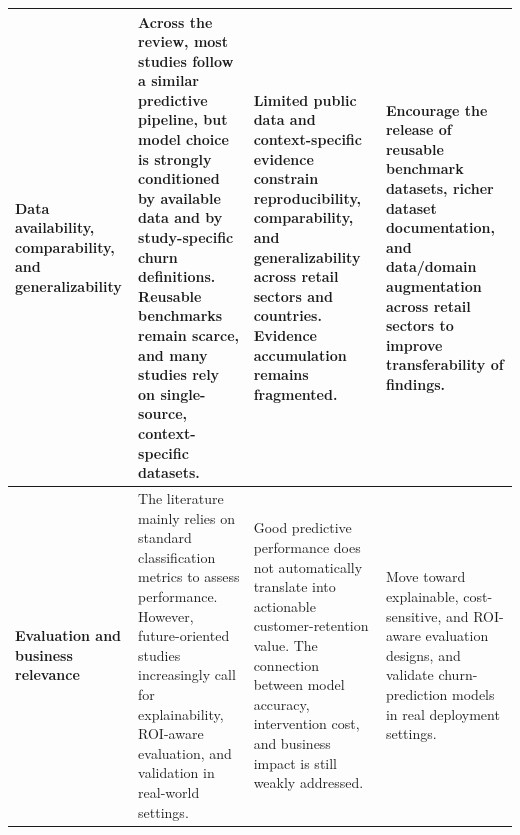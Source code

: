 \begin{table}[t]
{\begin{tabular}{|
>{\raggedright\arraybackslash}p{3.1cm}|
>{\raggedright\arraybackslash}p{5.2cm}|
>{\raggedright\arraybackslash}p{4.8cm}|
>{\raggedright\arraybackslash}p{4.8cm}|}
\textbf{Data availability, comparability, and generalizability} &
Across the review, most studies follow a similar predictive pipeline, but model choice is strongly conditioned by available data and by study-specific churn definitions. Reusable benchmarks remain scarce, and many studies rely on single-source, context-specific datasets. &
Limited public data and context-specific evidence constrain reproducibility, comparability, and generalizability across retail sectors and countries. Evidence accumulation remains fragmented. &
Encourage the release of reusable benchmark datasets, richer dataset documentation, and data/domain augmentation across retail sectors to improve transferability of findings. \\ \hline

\textbf{Evaluation and business relevance} &
The literature mainly relies on standard classification metrics to assess performance. However, future-oriented studies increasingly call for explainability, ROI-aware evaluation, and validation in real-world settings. &
Good predictive performance does not automatically translate into actionable customer-retention value. The connection between model accuracy, intervention cost, and business impact is still weakly addressed. &
Move toward explainable, cost-sensitive, and ROI-aware evaluation designs, and validate churn-prediction models in real deployment settings. \\ \hline

\end{tabular}
}
\end{table}
